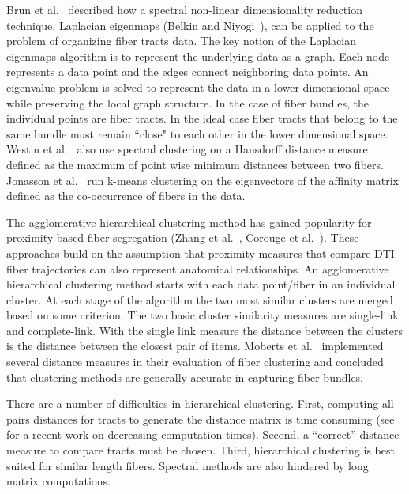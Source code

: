 Brun et al.~\cite{Brun2003} described how a spectral non-linear dimensionality reduction technique,  Laplacian eigenmaps (Belkin and Niyogi~\cite{Belkin01}), can be applied to the problem of organizing fiber tracts data. The key notion of the Laplacian eigenmaps algorithm is to represent the underlying data as a graph. Each node represents a data point and the edges connect neighboring data points. An eigenvalue problem is solved to represent the data in a lower dimensional space while preserving the local graph structure. In the case of fiber bundles, the individual points are fiber tracts. In the ideal case fiber tracts that belong to the same bundle must remain ``close" to each other in the lower dimensional space. Westin et al.~\cite{westinMEDIA02} also use spectral clustering on a Hausdorff distance measure defined as the maximum of point wise minimum distances between two fibers. Jonasson et al.~\cite{jonasson2005} run k-means clustering on the eigenvectors of the affinity matrix defined as the co-occurrence of fibers in the data.

The agglomerative hierarchical clustering method \cite{DudaHartStork01} has gained popularity for proximity based fiber segregation (Zhang et al.~\cite{Zhang2008}, Corouge et al.~\cite{Corouge2004}). 
These approaches build on the assumption that proximity measures that compare DTI fiber trajectories can also represent anatomical relationships. An agglomerative hierarchical clustering method starts with each data point/fiber in an individual cluster. At each stage of the algorithm the two most similar clusters are merged based on some criterion. The two basic cluster similarity measures are single-link and complete-link. With the single link measure the distance between the clusters is the distance between the closest pair of items. 
Moberts et al.~\cite{Moberts2005} implemented several distance measures in their evaluation of fiber clustering and concluded that clustering methods are generally accurate in capturing fiber bundles. 

There are a number of difficulties in hierarchical clustering. First, computing all pairs distances for tracts to generate the distance matrix is time consuming (see~\cite{Garyfallidis2012} for a recent work on decreasing computation times). Second, a ``correct'' distance measure to compare tracts must be chosen. Third, hierarchical clustering is best suited for similar length fibers.
Spectral methods are also hindered by long matrix computations.


